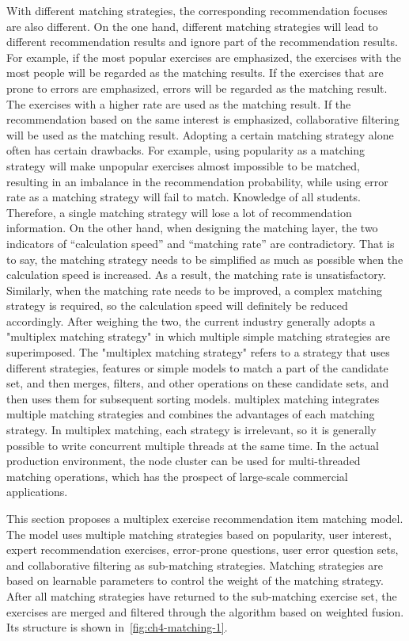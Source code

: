 With different matching strategies, the corresponding recommendation focuses are also different. On the one hand, different matching strategies will lead to different recommendation results and ignore part of the recommendation results. For example, if the most popular exercises are emphasized, the exercises with the most people will be regarded as the matching results. If the exercises that are prone to errors are emphasized, errors will be regarded as the matching result. The exercises with a higher rate are used as the matching result. If the recommendation based on the same interest is emphasized, collaborative filtering will be used as the matching result. Adopting a certain matching strategy alone often has certain drawbacks. For example, using popularity as a matching strategy will make unpopular exercises almost impossible to be matched, resulting in an imbalance in the recommendation probability, while using error rate as a matching strategy will fail to match. Knowledge of all students. Therefore, a single matching strategy will lose a lot of recommendation information. On the other hand, when designing the matching layer, the two indicators of ``calculation speed'' and ``matching rate'' are contradictory. That is to say, the matching strategy needs to be simplified as much as possible when the calculation speed is increased. As a result, the matching rate is unsatisfactory. Similarly, when the matching rate needs to be improved, a complex matching strategy is required, so the calculation speed will definitely be reduced accordingly. After weighing the two, the current industry generally adopts a "multiplex matching strategy" in which multiple simple matching strategies are superimposed. The "multiplex matching strategy" refers to a strategy that uses different strategies, features or simple models to match a part of the candidate set, and then merges, filters, and other operations on these candidate sets, and then uses them for subsequent sorting models. multiplex matching integrates multiple matching strategies and combines the advantages of each matching strategy. In multiplex matching, each strategy is irrelevant, so it is generally possible to write concurrent multiple threads at the same time. In the actual production environment, the node cluster can be used for multi-threaded matching operations, which has the prospect of large-scale commercial applications.

This section proposes a multiplex exercise recommendation item matching model. The model uses multiple matching strategies based on popularity, user interest, expert recommendation exercises, error-prone questions, user error question sets, and collaborative filtering as sub-matching strategies. Matching strategies are based on learnable parameters to control the weight of the matching strategy. After all matching strategies have returned to the sub-matching exercise set, the exercises are merged and filtered through the algorithm based on weighted fusion. Its structure is shown in~\figurename{\ref{fig:ch4-matching-1}}.

